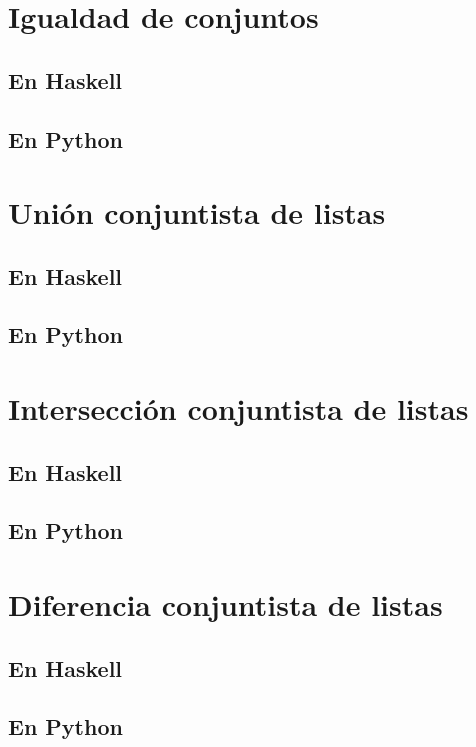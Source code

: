 \documentclass[a4paper,12pt,twoside]{book}
\begin{document}
\section{Igualdad de conjuntos}
\subsection*{En Haskell}
\subsection*{En Python}

\section{Unión conjuntista de listas}
\subsection*{En Haskell}
\subsection*{En Python}

\section{Intersección conjuntista de listas}
\subsection*{En Haskell}
\subsection*{En Python}

\section{Diferencia conjuntista de listas}
\subsection*{En Haskell}
\subsection*{En Python}
\end{document}
